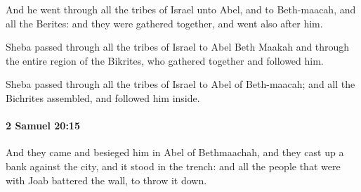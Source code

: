 			\begin{versebox}
					\item[BHS] 
					\item[ASV] And he went through all the tribes of Israel unto Abel, and to Beth-maacah, and all the Berites: and they were gathered together, and went also after him.
					\item[NIV] Sheba passed through all the tribes of Israel to Abel Beth Maakah and through the entire region of the Bikrites, who gathered together and followed him.
					\item[NRSV] Sheba passed through all the tribes of Israel to Abel of Beth-maacah; and all the Bichrites assembled, and followed him inside.
			\end{versebox}

		\paragraph{2 Samuel 20:15} %
			\label{2SAMUEL-20-15}

			And they came and besieged him in Abel of Bethmaachah, and they cast up a bank against the city, and it stood in the trench: and all the people that were with Joab battered the wall, to throw it down.

